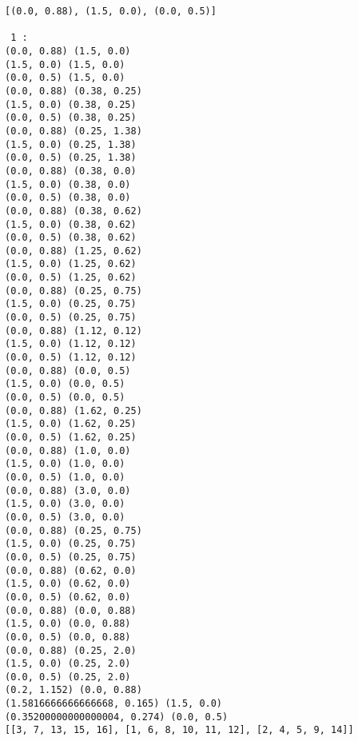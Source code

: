 \documentclass[11pt]{article}
\begin{document}
    \begin{Verbatim}[commandchars=\\\{\}]
[(0.0, 0.88), (1.5, 0.0), (0.0, 0.5)]

 1 :
(0.0, 0.88) (1.5, 0.0)
(1.5, 0.0) (1.5, 0.0)
(0.0, 0.5) (1.5, 0.0)
(0.0, 0.88) (0.38, 0.25)
(1.5, 0.0) (0.38, 0.25)
(0.0, 0.5) (0.38, 0.25)
(0.0, 0.88) (0.25, 1.38)
(1.5, 0.0) (0.25, 1.38)
(0.0, 0.5) (0.25, 1.38)
(0.0, 0.88) (0.38, 0.0)
(1.5, 0.0) (0.38, 0.0)
(0.0, 0.5) (0.38, 0.0)
(0.0, 0.88) (0.38, 0.62)
(1.5, 0.0) (0.38, 0.62)
(0.0, 0.5) (0.38, 0.62)
(0.0, 0.88) (1.25, 0.62)
(1.5, 0.0) (1.25, 0.62)
(0.0, 0.5) (1.25, 0.62)
(0.0, 0.88) (0.25, 0.75)
(1.5, 0.0) (0.25, 0.75)
(0.0, 0.5) (0.25, 0.75)
(0.0, 0.88) (1.12, 0.12)
(1.5, 0.0) (1.12, 0.12)
(0.0, 0.5) (1.12, 0.12)
(0.0, 0.88) (0.0, 0.5)
(1.5, 0.0) (0.0, 0.5)
(0.0, 0.5) (0.0, 0.5)
(0.0, 0.88) (1.62, 0.25)
(1.5, 0.0) (1.62, 0.25)
(0.0, 0.5) (1.62, 0.25)
(0.0, 0.88) (1.0, 0.0)
(1.5, 0.0) (1.0, 0.0)
(0.0, 0.5) (1.0, 0.0)
(0.0, 0.88) (3.0, 0.0)
(1.5, 0.0) (3.0, 0.0)
(0.0, 0.5) (3.0, 0.0)
(0.0, 0.88) (0.25, 0.75)
(1.5, 0.0) (0.25, 0.75)
(0.0, 0.5) (0.25, 0.75)
(0.0, 0.88) (0.62, 0.0)
(1.5, 0.0) (0.62, 0.0)
(0.0, 0.5) (0.62, 0.0)
(0.0, 0.88) (0.0, 0.88)
(1.5, 0.0) (0.0, 0.88)
(0.0, 0.5) (0.0, 0.88)
(0.0, 0.88) (0.25, 2.0)
(1.5, 0.0) (0.25, 2.0)
(0.0, 0.5) (0.25, 2.0)
(0.2, 1.152) (0.0, 0.88)
(1.5816666666666668, 0.165) (1.5, 0.0)
(0.35200000000000004, 0.274) (0.0, 0.5)
[[3, 7, 13, 15, 16], [1, 6, 8, 10, 11, 12], [2, 4, 5, 9, 14]]


\end{Verbatim}
\end{document}
